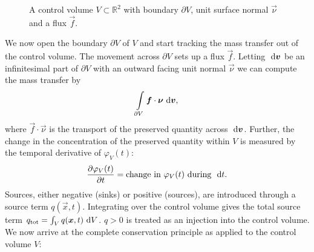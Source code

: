 \begin{figure}[ht]
\centering
{}
\caption{A control volume $V \subset \mathbb{R}^2$ with boundary $\partial V$, unit surface normal $\vec{\nu}$ and a flux $\vec{f}$.}
\label{fig:control_volume}
\end{figure}
We now open the boundary $\partial V$ of $V$ and start tracking the mass transfer out of the control volume. The movement across $\partial V$ sets up a flux $\vec{f}$. Letting $\ \text{d}\boldsymbol{v}$ be an infinitesimal part of $\partial V$ with an outward facing unit normal $\vec{\nu}$ we can compute the mass transfer by
\begin{equation*}
 \int \limits_{\partial V} \boldsymbol{f} \cdot \boldsymbol{\nu} \ \text{d}\boldsymbol{v},
\end{equation*}
where $\vec{f} \cdot \vec{\nu}$ is the transport of the preserved quantity across $\ \text{d}\boldsymbol{v}$. Further, the change in the concentration of the preserved quantity within $V$ is measured by the temporal derivative of $\varphi_V(t)$:
\begin{equation*}
\frac{\partial \varphi_V(t)}{\partial t} = \text{change in $\varphi_V(t)$ during $\ \text{d}t$}.
\end{equation*}
Sources, either negative (sinks) or positive (sources), are introduced through a source term $q(\vec{x},t)$. Integrating over the control volume gives the total source term $q_{\text{tot}} = \int_V q(\boldsymbol{x},t) \ \text{d}V$. $q > 0$ is treated as an injection into the control volume. We now arrive at the complete conservation principle as applied to the control volume $V$:
